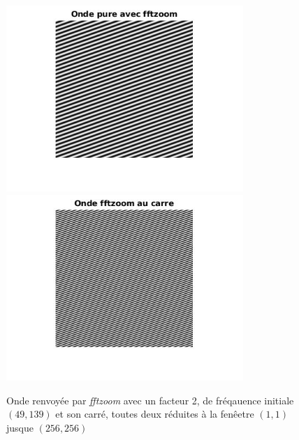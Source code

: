 \documentclass[12pt,a4paper,onecolumn]{article}
\begin{document}
\begin{figure}[H]
	\begin{center}
		\includegraphics[width = 0.8\textwidth]{ex5_q2_onde.jpg}
		\includegraphics[width = 0.8\textwidth]{ex5_q2_square.jpg}
	\end{center}
	\caption{Onde renvoyée par \textit{fftzoom} avec un facteur 2, de fréqauence initiale $(49, 139)$ et son carré, toutes deux réduites à la fenêetre $(1, 1)$ jusque $(256, 256)$}
	\label{ex5_q2}
\end{figure}
\end{document}

